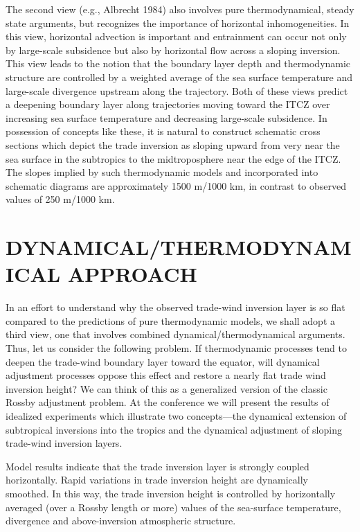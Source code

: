 The second view (e.g., Albrecht 1984) also
involves pure thermodynamical, steady state arguments, but recognizes the
importance of horizontal inhomogeneities.  In this view, horizontal advection
is important and entrainment can occur not only by large-scale subsidence but
also by horizontal flow across a sloping inversion.  This view leads to the
notion that the boundary layer depth and thermodynamic structure are
controlled by a weighted average of the sea surface temperature and
large-scale divergence upstream along the trajectory.  Both of these views 
predict a deepening boundary layer along trajectories moving toward the ITCZ
over increasing sea surface temperature and decreasing large-scale subsidence.
 In possession of concepts like these, it is natural to construct schematic
cross sections which depict the trade inversion
as sloping upward from very near the sea surface in the subtropics to the
midtroposphere near the edge of the ITCZ.  The slopes implied by such
thermodynamic models and incorporated into schematic diagrams are
approximately 1500 m/1000 km, in contrast to observed values of 250 m/1000 km.

\section {DYNAMICAL/THERMODYNAMICAL APPROACH}

     In an effort to understand why the observed trade-wind inversion layer is
so flat compared to the predictions of pure thermodynamic models, we shall
adopt a third view, one that involves combined dynamical/thermodynamical
arguments. Thus, let us consider the following problem.  If thermodynamic
processes tend to deepen the trade-wind boundary layer toward the equator,
will dynamical adjustment processes oppose this effect and restore a nearly
flat trade wind inversion height?  We can think of this as a generalized
version of the classic Rossby adjustment problem.  At the conference 
we will present the results of idealized experiments which illustrate two
concepts---the dynamical extension of subtropical inversions into the tropics
and the dynamical adjustment of sloping trade-wind inversion layers.  

Model results indicate that the trade inversion layer is strongly
coupled horizontally.  Rapid variations in trade inversion height are
dynamically smoothed.  In this way, the trade inversion height is controlled
by horizontally averaged (over a Rossby length or more) values of the
sea-surface temperature, divergence and above-inversion atmospheric structure.

